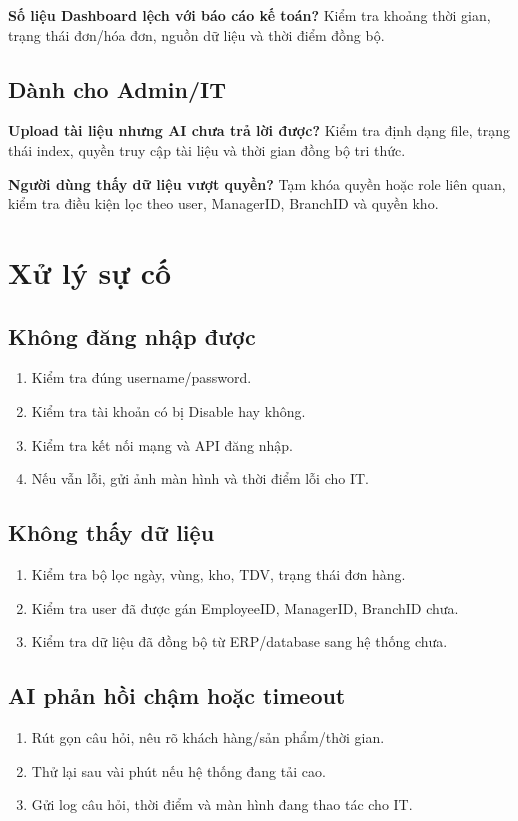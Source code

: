 \documentclass[12pt,a4paper,oneside,openany]{book}
\begin{document}
\textbf{Số liệu Dashboard lệch với báo cáo kế toán?} Kiểm tra khoảng thời gian, trạng thái đơn/hóa đơn, nguồn dữ liệu và thời điểm đồng bộ.

\section*{Dành cho Admin/IT}
\textbf{Upload tài liệu nhưng AI chưa trả lời được?} Kiểm tra định dạng file, trạng thái index, quyền truy cập tài liệu và thời gian đồng bộ tri thức.

\textbf{Người dùng thấy dữ liệu vượt quyền?} Tạm khóa quyền hoặc role liên quan, kiểm tra điều kiện lọc theo user, ManagerID, BranchID và quyền kho.

\chapter{Xử lý sự cố}

\section*{Không đăng nhập được}
\begin{enumerate}
  \item Kiểm tra đúng username/password.
  \item Kiểm tra tài khoản có bị Disable hay không.
  \item Kiểm tra kết nối mạng và API đăng nhập.
  \item Nếu vẫn lỗi, gửi ảnh màn hình và thời điểm lỗi cho IT.
\end{enumerate}

\section*{Không thấy dữ liệu}
\begin{enumerate}
  \item Kiểm tra bộ lọc ngày, vùng, kho, TDV, trạng thái đơn hàng.
  \item Kiểm tra user đã được gán EmployeeID, ManagerID, BranchID chưa.
  \item Kiểm tra dữ liệu đã đồng bộ từ ERP/database sang hệ thống chưa.
\end{enumerate}

\section*{AI phản hồi chậm hoặc timeout}
\begin{enumerate}
  \item Rút gọn câu hỏi, nêu rõ khách hàng/sản phẩm/thời gian.
  \item Thử lại sau vài phút nếu hệ thống đang tải cao.
  \item Gửi log câu hỏi, thời điểm và màn hình đang thao tác cho IT.
\end{enumerate}
\end{document}
